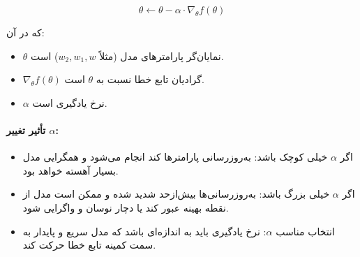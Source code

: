 \[
\theta \leftarrow \theta - \alpha \cdot \nabla_\theta f(\theta)
\]

که در آن:
\begin{itemize}
	\item $\theta$ نمایان‌گر پارامترهای مدل (مثلاً $w_2, w_1, w$) است.
	\item $\nabla_\theta f(\theta)$ گرادیان تابع خطا نسبت به $\theta$ است.
	\item $\alpha$ نرخ یادگیری است.
\end{itemize}

\paragraph{تأثیر تغییر $\alpha$:}

\begin{itemize}
	\item اگر $\alpha$ خیلی کوچک باشد:  
	به‌روزرسانی پارامترها کند انجام می‌شود و همگرایی مدل بسیار آهسته خواهد بود.
	
	\item اگر $\alpha$ خیلی بزرگ باشد:  
	به‌روزرسانی‌ها بیش‌از‌حد شدید شده و ممکن است مدل از نقطه بهینه عبور کند یا دچار نوسان و واگرایی شود.
	
	\item انتخاب مناسب $\alpha$:  
	نرخ یادگیری باید به اندازه‌ای باشد که مدل سریع و پایدار به سمت کمینه تابع خطا حرکت کند.
\end{itemize}
